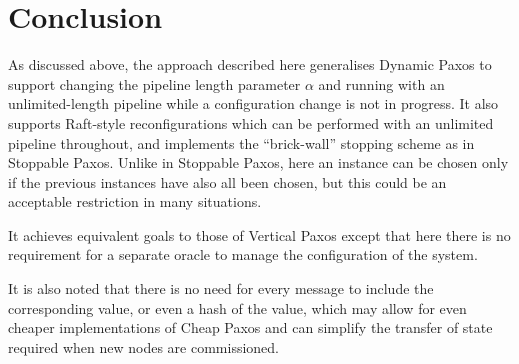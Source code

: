 \documentclass[journal]{IEEEtran}
\begin{document}
\section{Conclusion}

As discussed above, the approach described here generalises Dynamic
Paxos\cite{cheap-paxos} to support changing the pipeline length parameter
$\alpha$ and running with an unlimited-length pipeline while a configuration
change is not in progress. It also supports Raft-style
reconfigurations\cite{raft} which can be performed with an unlimited pipeline
throughout, and implements the ``brick-wall'' stopping scheme as in Stoppable
Paxos\cite{stoppable-paxos}. Unlike in Stoppable Paxos, here an instance can be
chosen only if the previous instances have also all been chosen, but this could
be an acceptable restriction in many situations.

It achieves equivalent goals to those of Vertical Paxos\cite{vertical-paxos}
except that here there is no requirement for a separate oracle to manage the
configuration of the system.

It is also noted that there is no need for every message to include the
corresponding value, or even a hash of the value, which may allow for even
cheaper implementations of Cheap Paxos\cite{cheap-paxos} and can simplify the
transfer of state\cite{vertical-paxos} required when new nodes are
commissioned.

%
%
\end{document}
